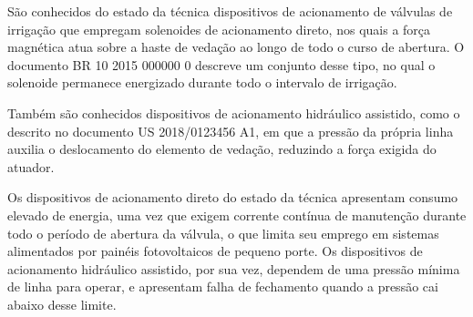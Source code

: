 

\pnum São conhecidos do estado da técnica dispositivos de acionamento de
válvulas de irrigação que empregam solenoides de acionamento direto, nos quais
a força magnética atua sobre a haste de vedação ao longo de todo o curso de
abertura. O documento BR 10 2015 000000 0 descreve um conjunto desse tipo, no
qual o solenoide permanece energizado durante todo o intervalo de irrigação.

\pnum Também são conhecidos dispositivos de acionamento hidráulico assistido,
como o descrito no documento US 2018/0123456 A1, em que a pressão da própria
linha auxilia o deslocamento do elemento de vedação, reduzindo a força exigida
do atuador.

\pnum Os dispositivos de acionamento direto do estado da técnica apresentam
consumo elevado de energia, uma vez que exigem corrente contínua de manutenção
durante todo o período de abertura da válvula, o que limita seu emprego em
sistemas alimentados por painéis fotovoltaicos de pequeno porte. Os
dispositivos de acionamento hidráulico assistido, por sua vez, dependem de uma
pressão mínima de linha para operar, e apresentam falha de fechamento quando a
pressão cai abaixo desse limite.

